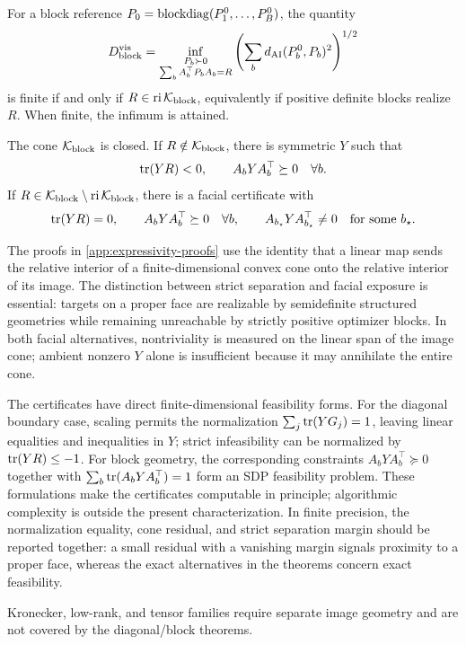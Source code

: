 \begin{theorem}
\label{thm:block-expressivity}
\mbox{}\par\noindent
For a block reference \(P_0=\operatorname{blockdiag}(P_1^0,\ldots,P_B^0)\), the quantity
\begin{equation}
  D_{\mathrm{block}}^{\mathrm{vis}}
  =
  \inf_{\substack{P_b\succ0\\\sum_bA_b^\top P_bA_b=R}}
  \left(\sum_bd_{\mathrm{AI}}(P_b^0,P_b)^2\right)^{1/2}
  \label{eq:block-complexity}
\end{equation}
is finite if and only if
\(R\in\operatorname{ri}\mathcal K_{\mathrm{block}}\), equivalently if positive definite
blocks realize \(R\).  When finite, the infimum is attained.

The cone \(\mathcal K_{\mathrm{block}}\) is closed.  If
\(R\notin\mathcal K_{\mathrm{block}}\), there is symmetric \(Y\)
such that
\[
  \operatorname{tr}(YR)<0,
  \qquad
  A_bYA_b^\top\succeq0\quad\forall b.
\]
If
\(R\in\mathcal K_{\mathrm{block}}\setminus
\operatorname{ri}\mathcal K_{\mathrm{block}}\), there is a facial certificate with
\[
  \operatorname{tr}(YR)=0,
  \qquad
  A_bYA_b^\top\succeq0\quad\forall b,
  \qquad
  A_{b_\star}YA_{b_\star}^\top\ne0\quad\text{for some }b_\star.
\]
\end{theorem}

The proofs in \cref{app:expressivity-proofs} use the identity that a linear
map sends the relative interior of a finite-dimensional convex cone onto the
relative interior of its image.  The distinction between strict separation
and facial exposure is essential: targets on a proper face are realizable by
semidefinite structured geometries while remaining unreachable by strictly
positive optimizer blocks.  In both facial alternatives, nontriviality is
measured on the linear span of the image cone; ambient nonzero \(Y\) alone is
insufficient because it may annihilate the entire cone.

The certificates have direct finite-dimensional feasibility forms.  For the
diagonal boundary case, scaling permits the normalization
\(\sum_j\operatorname{tr}(YG_j)=1\), leaving linear equalities and inequalities in \(Y\);
strict infeasibility can be normalized by \(\operatorname{tr}(YR)\le-1\).  For block
geometry, the corresponding constraints
\(A_bYA_b^\top\succeq0\) together with
\(\sum_b\operatorname{tr}(A_bYA_b^\top)=1\) form an SDP feasibility problem.  These
formulations make the certificates computable in principle; algorithmic
complexity is outside the present characterization.  In finite precision,
the normalization equality, cone residual, and strict separation margin
should be reported together: a small residual with a vanishing margin signals
proximity to a proper face, whereas the exact alternatives in the theorems
concern exact feasibility.

Kronecker, low-rank, and tensor families require separate image geometry and
are not covered by the diagonal/block theorems.
